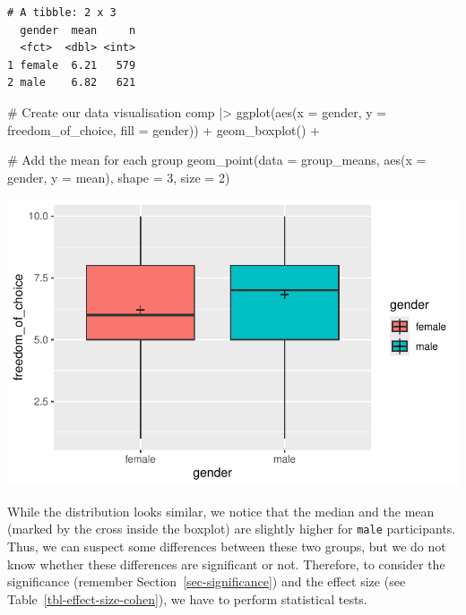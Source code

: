 \documentclass[
  letterpaper,
]{krantz}
\makeatletter
\newenvironment{Shaded}{\begin{snugshade}}{\end{snugshade}}
\newcommand{\AttributeTok}[1]{\textcolor[rgb]{0.40,0.45,0.13}{#1}}
\newcommand{\CommentTok}[1]{\textcolor[rgb]{0.37,0.37,0.37}{#1}}
\newcommand{\DecValTok}[1]{\textcolor[rgb]{0.68,0.00,0.00}{#1}}
\newcommand{\FunctionTok}[1]{\textcolor[rgb]{0.28,0.35,0.67}{#1}}
\newcommand{\NormalTok}[1]{\textcolor[rgb]{0.00,0.23,0.31}{#1}}
\newcommand{\SpecialCharTok}[1]{\textcolor[rgb]{0.37,0.37,0.37}{#1}}
\newenvironment{kframe}{%
\medskip{}
\setlength{\fboxsep}{.8em}
 \def\at@end@of@kframe{}%
 \ifinner\ifhmode%
  \def\at@end@of@kframe{\end{minipage}}%
  \begin{minipage}{\columnwidth}%
 \fi\fi%
 \def\FrameCommand##1{\hskip\@totalleftmargin \hskip-\fboxsep
 \colorbox{shadecolor}{##1}\hskip-\fboxsep
     \hskip-\linewidth \hskip-\@totalleftmargin \hskip\columnwidth}%
 \MakeFramed {\advance\hsize-\width
   \@totalleftmargin\z@ \linewidth\hsize
   \@setminipage}}%
 {\par\unskip\endMakeFramed%
 \at@end@of@kframe}
\renewenvironment{Shaded}{\begin{kframe}}{\end{kframe}}
\makeatother
\begin{document}
\begin{verbatim}
# A tibble: 2 x 3
  gender  mean     n
  <fct>  <dbl> <int>
1 female  6.21   579
2 male    6.82   621
\end{verbatim}

\begin{Shaded}
\begin{Highlighting}[]
\CommentTok{\# Create our data visualisation}
\NormalTok{comp }\SpecialCharTok{|\textgreater{}}
  \FunctionTok{ggplot}\NormalTok{(}\FunctionTok{aes}\NormalTok{(}\AttributeTok{x =}\NormalTok{ gender, }\AttributeTok{y =}\NormalTok{ freedom\_of\_choice, }\AttributeTok{fill =}\NormalTok{ gender)) }\SpecialCharTok{+}
  \FunctionTok{geom\_boxplot}\NormalTok{() }\SpecialCharTok{+}

  \CommentTok{\# Add the mean for each group}
  \FunctionTok{geom\_point}\NormalTok{(}\AttributeTok{data =}\NormalTok{ group\_means,}
             \FunctionTok{aes}\NormalTok{(}\AttributeTok{x =}\NormalTok{ gender, }\AttributeTok{y =}\NormalTok{ mean),}
             \AttributeTok{shape =} \DecValTok{3}\NormalTok{,}
             \AttributeTok{size =} \DecValTok{2}\NormalTok{)}
\end{Highlighting}
\end{Shaded}

\includegraphics{11_group_comparison_files/figure-pdf/two-unpaired-groups-plot-1.pdf}

While the distribution looks similar, we notice that the median and the
mean (marked by the cross inside the boxplot) are slightly higher for
\texttt{male} participants. Thus, we can suspect some differences
between these two groups, but we do not know whether these differences
are significant or not. Therefore, to consider the significance
(remember Section~\ref{sec-significance}) and the effect size (see
Table~\ref{tbl-effect-size-cohen}), we have to perform statistical
tests.
\end{document}

